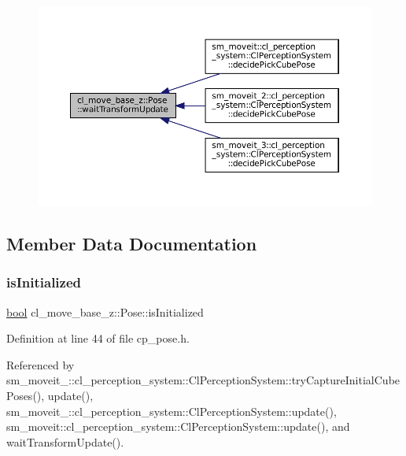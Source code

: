\nopagebreak
\begin{figure}[H]
\begin{center}
\leavevmode
\includegraphics[width=350pt]{classcl__move__base__z_1_1Pose_a5f8576c3dacfb2f2e7f9df5105c480ea_icgraph}
\end{center}
\end{figure}


\subsection{Member Data Documentation}
\mbox{\label{classcl__move__base__z_1_1Pose_a49df3a978021edb71a48ef5e6d8e75a8}} 
\subsubsection{\texorpdfstring{is\+Initialized}{isInitialized}}
{\footnotesize\ttfamily \hyperlink{classbool}{bool} cl\+\_\+move\+\_\+base\+\_\+z\+::\+Pose\+::is\+Initialized}



Definition at line 44 of file cp\+\_\+pose.\+h.



Referenced by sm\+\_\+moveit\+\_\+::cl\+\_\+perception\+\_\+system\+::\+Cl\+Perception\+System\+::try\+Capture\+Initial\+Cube\+Poses(), update(), sm\+\_\+moveit\+\_\+::cl\+\_\+perception\+\_\+system\+::\+Cl\+Perception\+System\+::update(), sm\+\_\+moveit\+::cl\+\_\+perception\+\_\+system\+::\+Cl\+Perception\+System\+::update(), and wait\+Transform\+Update().


